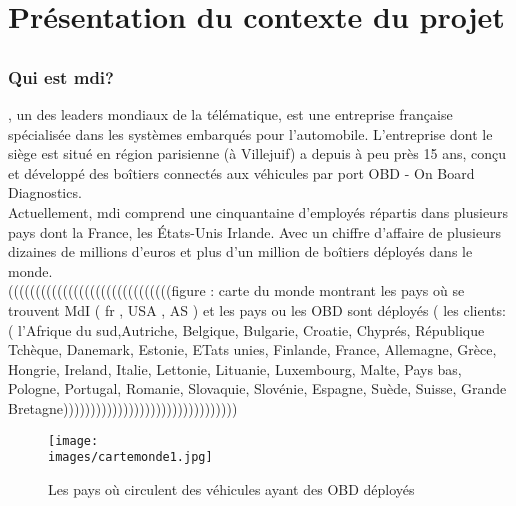 \section{Présentation du contexte du projet}
    \subsection{\company{}}
        \subsubsection{Qui est \texorpdfstring{\gls{mdi}}{MDI}?}
            \company{}\cite{mdi_site}, un des leaders mondiaux de la télématique, est une entreprise
            française spécialisée dans les systèmes embarqués pour l'automobile.
            L’entreprise dont le siège est situé en région parisienne (à Villejuif) a depuis à peu près
            15 ans, conçu et développé des boîtiers connectés aux véhicules par port OBD - On
            Board Diagnostics.\\
            Actuellement, \gls{mdi} comprend une cinquantaine d’employés répartis dans plusieurs
            pays dont la France, les États-Unis  Irlande. Avec un chiffre d’affaire de
            plusieurs dizaines de millions d’euros et plus d’un million de boîtiers déployés dans le
            monde.\\


            ((((((((((((((((((((((((((((((figure : carte du monde montrant les pays où se trouvent MdI ( fr , USA , AS ) et les 
            pays ou les OBD sont déployés ( les clients:  ( l’Afrique du sud,Autriche, Belgique, Bulgarie, Croatie, Chyprés, République Tchèque, Danemark, Estonie, ETats unies, Finlande, France, Allemagne, Grèce, Hongrie, Ireland, Italie, Lettonie, Lituanie, Luxembourg, Malte, Pays bas, Pologne, Portugal, Romanie, Slovaquie, Slovénie, Espagne, Suède, Suisse, Grande Bretagne))))))))))))))))))))))))))))))))
            \begin{figure}[ht]
                \centering
                \texttt{[image: \\images/cartemonde1.jpg]}
                \caption{Les pays où circulent des véhicules ayant des OBD déployés }
            \end{figure}


